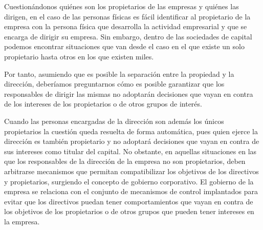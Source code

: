 \documentclass[12pt,a4paper,spanish]{report}
\begin{document}
			Cuestionándonos quiénes son los propietarios de las empresas y quiénes las dirigen, en el caso de las personas físicas es fácil identificar al propietario de la empresa con la persona física que desarrolla la actividad empresarial y que se encarga de dirigir su empresa. Sin embargo, dentro de las sociedades de capital podemos encontrar situaciones que van desde el caso en el que existe un solo propietario hasta otros en los que existen miles.

			Por tanto, asumiendo que es posible la separación entre la propiedad y la dirección, deberíamos preguntarnos cómo es posible garantizar que los responsables de dirigir las mismas no adoptarán decisiones que vayan en contra de los intereses de los propietarios o de otros grupos de interés. 

			Cuando las personas encargadas de la dirección son además los únicos propietarios la cuestión queda resuelta de forma automática, pues quien ejerce la dirección es también propietario y no adoptará decisiones que vayan en contra de sus intereses como titular del capital. No obstante, en aquellas situaciones en las que los responsables de la dirección de la empresa no son propietarios, deben arbitrarse mecanismos que permitan compatibilizar los objetivos de los directivos y propietarios, surgiendo el concepto de gobierno corporativo. El gobierno de la empresa se relaciona con el conjunto de mecanismos de control implantados para evitar que los directivos puedan tener comportamientos que vayan en contra de los objetivos de los propietarios o de otros grupos que pueden tener intereses en la empresa.
\end{document}
